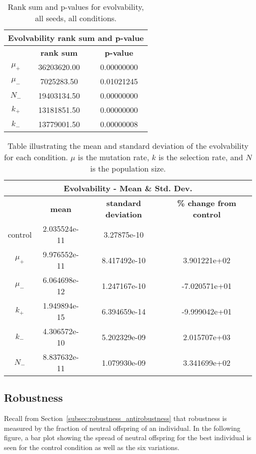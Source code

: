\begin{table}[H]
	\begin{tabular}{|c|c|c|}
		\hline
		\multicolumn{3}{c}{\Large \textbf{Evolvability rank sum and p-value}} \\
		\hline
		& \textbf{rank sum} & \textbf{p-value} \\
		\hline
		$\mu_+$ & 36203620.00 & 0.00000000 \\ 
		\hline
		$\mu_-$ & 7025283.50 & 0.01021245 \\ 
		\hline
		$N_-$ & 19403134.50 & 0.00000000 \\ 
		\hline
		$k_+$ & 13181851.50 & 0.00000000 \\ 
		\hline
		$k_-$ & 13779001.50 & 0.00000008 \\ 
		\hline
	\end{tabular}
	\caption[Evolvability - rank sum and p-value]{Rank sum and p-values for evolvability, all seeds, all conditions.}
	\label{table:evolvability-rank_sum_and_p-values}
\end{table}

\begin{table}[H]
	\centering
	\begin{tabular}{| c | c | c | c |}
		\hline
		\multicolumn{4}{c}{\Large Evolvability - Mean \& Std. Dev.} \\
		\hline
		& \textbf{mean} & \textbf{standard deviation} & \textbf{\% change from control} \\
		\hline
		\hline
		control & 2.035524e-11 & 3.27875e-10 & \textemdash \\ 
		\hline
		$\mu_+$ & 9.976552e-11 & 8.417492e-10 & 3.901221e+02 \\ 
		\hline
		$\mu_-$ & 6.064698e-12 & 1.247167e-10 & -7.020571e+01 \\ 
		\hline
		$k_+$ & 1.949894e-15 & 6.394659e-14 & -9.999042e+01 \\ 
		\hline
		$k_-$ & 4.306572e-10 & 5.202329e-09 & 2.015707e+03 \\ 
		\hline
		$N_-$ & 8.837632e-11 & 1.079930e-09 & 3.341699e+02 \\ 
		\hline	 		 
	\end{tabular}
	\caption[Evolvability mean and standard deviation]{Table illustrating the mean and standard deviation of the evolvability for each condition. $\mu$ is the mutation rate, $k$ is the selection rate, and $N$ is the population size.}
	\label{table:mean_std_dev_evolvability}
\end{table}

\subsection{Robustness}
Recall from Section~\ref{subsec:robustness_antirobustness} that robustness is measured by the fraction of neutral offspring of an individual. In the following figure, a bar plot showing the spread of neutral offspring for the best individual is seen for the control condition as well as the six variations. 

